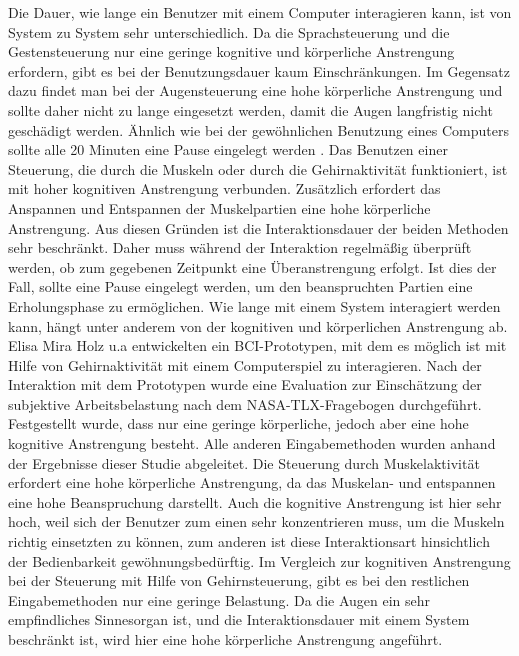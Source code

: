 Die Dauer, wie lange ein Benutzer mit einem Computer interagieren kann, ist von System zu System sehr unterschiedlich. Da die Sprachsteuerung und die Gestensteuerung nur eine geringe kognitive und körperliche Anstrengung erfordern, gibt es bei der Benutzungsdauer kaum Einschränkungen. Im Gegensatz dazu findet man bei der Augensteuerung eine hohe körperliche Anstrengung und sollte daher nicht zu lange eingesetzt werden, damit die Augen langfristig nicht geschädigt werden. Ähnlich wie bei der gewöhnlichen Benutzung eines Computers sollte alle 20 Minuten eine Pause eingelegt werden \cite{20Methode}. Das Benutzen einer Steuerung, die durch die Muskeln oder durch die Gehirnaktivität funktioniert, ist mit hoher kognitiven Anstrengung verbunden. Zusätzlich erfordert das Anspannen und Entspannen der Muskelpartien eine hohe körperliche Anstrengung. Aus diesen Gründen ist die Interaktionsdauer der beiden Methoden sehr beschränkt. Daher muss während der Interaktion regelmäßig überprüft werden, ob zum gegebenen Zeitpunkt eine Überanstrengung erfolgt. Ist dies der Fall, sollte eine Pause eingelegt werden, um den beanspruchten Partien eine Erholungsphase zu ermöglichen.
\newline \newline \newline \newline
Wie lange mit einem System interagiert werden kann, hängt unter anderem von der kognitiven und körperlichen Anstrengung ab. Elisa Mira Holz u.a \cite{holz2013brain} entwickelten ein BCI-Prototypen, mit dem es möglich ist mit Hilfe von Gehirnaktivität mit einem Computerspiel zu interagieren. Nach der Interaktion mit dem Prototypen wurde eine Evaluation zur Einschätzung der subjektive Arbeitsbelastung nach dem NASA-TLX-Fragebogen durchgeführt. Festgestellt wurde, dass nur eine geringe körperliche, jedoch aber eine hohe kognitive Anstrengung besteht. Alle anderen Eingabemethoden wurden anhand der Ergebnisse dieser Studie abgeleitet. Die Steuerung durch Muskelaktivität erfordert eine hohe körperliche Anstrengung, da das Muskelan- und entspannen eine hohe Beanspruchung darstellt. Auch die kognitive Anstrengung ist hier sehr hoch, weil sich der Benutzer zum einen sehr konzentrieren muss, um die Muskeln richtig einsetzten zu können, zum anderen ist diese Interaktionsart hinsichtlich der Bedienbarkeit gewöhnungsbedürftig. Im Vergleich zur kognitiven Anstrengung bei der Steuerung mit Hilfe von Gehirnsteuerung, gibt es bei den restlichen Eingabemethoden nur eine geringe Belastung. Da die Augen ein sehr empfindliches Sinnesorgan ist, und die Interaktionsdauer mit einem System beschränkt ist, wird hier eine hohe körperliche Anstrengung angeführt.
